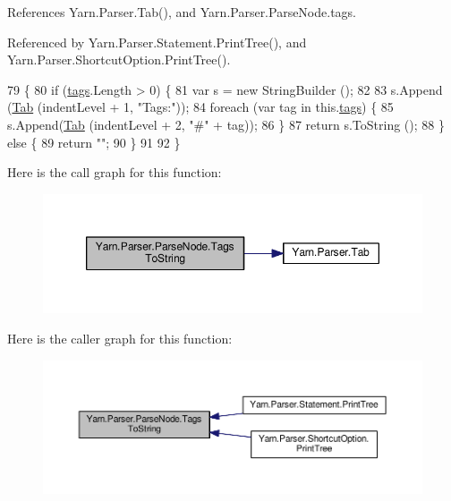 References Yarn.\-Parser.\-Tab(), and Yarn.\-Parser.\-Parse\-Node.\-tags.



Referenced by Yarn.\-Parser.\-Statement.\-Print\-Tree(), and Yarn.\-Parser.\-Shortcut\-Option.\-Print\-Tree().


\begin{DoxyCode}
79             \{
80                 \textcolor{keywordflow}{if} (\hyperlink{a00138_a58b3a15788fd2d4127d73619dc6d04ae}{tags}.Length > 0) \{
81                     var s = \textcolor{keyword}{new} StringBuilder ();
82 
83                     s.Append (\hyperlink{a00139_aa8fa36b46de12a1c561d77b99c4b9ae3}{Tab} (indentLevel + 1, \textcolor{stringliteral}{"Tags:"}));
84                     \textcolor{keywordflow}{foreach} (var tag \textcolor{keywordflow}{in} this.\hyperlink{a00138_a58b3a15788fd2d4127d73619dc6d04ae}{tags}) \{
85                         s.Append(\hyperlink{a00139_aa8fa36b46de12a1c561d77b99c4b9ae3}{Tab} (indentLevel + 2, \textcolor{stringliteral}{"#"} + tag));
86                     \}
87                     \textcolor{keywordflow}{return} s.ToString ();
88                 \} \textcolor{keywordflow}{else} \{
89                     \textcolor{keywordflow}{return} \textcolor{stringliteral}{""};
90                 \}
91 
92             \}
\end{DoxyCode}


Here is the call graph for this function\-:
\nopagebreak
\begin{figure}[H]
\begin{center}
\leavevmode
\includegraphics[width=350pt]{a00138_a054f36c80d5eeacd569a8859f599af67_cgraph}
\end{center}
\end{figure}




Here is the caller graph for this function\-:
\nopagebreak
\begin{figure}[H]
\begin{center}
\leavevmode
\includegraphics[width=350pt]{a00138_a054f36c80d5eeacd569a8859f599af67_icgraph}
\end{center}
\end{figure}


